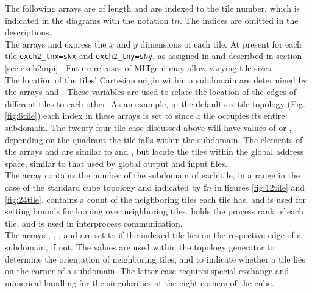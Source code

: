 The following arrays are of length  and are indexed to
the tile number, which is indicated in the diagrams with the notation
\textsf{t}$n$.  The indices are omitted in the descriptions. \\

The arrays  and
 express the $x$ and $y$ dimensions of
each tile.  At present for each tile \texttt{exch2\_tnx=sNx} and
\texttt{exch2\_tny=sNy}, as assigned in  and described in
section \ref{sec:exch2mpi} .  Future releases of MITgcm may allow varying tile
sizes. \\

The location of the tiles' Cartesian origin within a subdomain are
determined by the arrays  and
.  These variables are used to
relate the location of the edges of different tiles to each other.  As
an example, in the default six-tile topology (Fig. \ref{fig:6tile})
each index in these arrays is set to  since a tile occupies
its entire subdomain.  The twenty-four-tile case discussed above will
have values of  or , depending on the quadrant the
tile falls within the subdomain.  The elements of the arrays
 and
 are similar to
 and
, but locate the tiles within the
global address space, similar to that used by global output and input
files. \\

The array  contains the number of
the subdomain of each tile, in a range  in the case of the
standard cube topology and indicated by \textbf{\textsf{f}}$n$ in
figures \ref{fig:12tile} and
\ref{fig:24tile}. 
contains a count of the neighboring tiles each tile has, and is used
for setting bounds for looping over neighboring tiles.
 holds the process rank of each
tile, and is used in interprocess communication.  \\


The arrays ,
,
, and
 are set to  if the
indexed tile lies on the respective edge of a subdomain,  if
not.  The values are used within the topology generator to determine
the orientation of neighboring tiles, and to indicate whether a tile
lies on the corner of a subdomain.  The latter case requires special
exchange and numerical handling for the singularities at the eight
corners of the cube. \\


